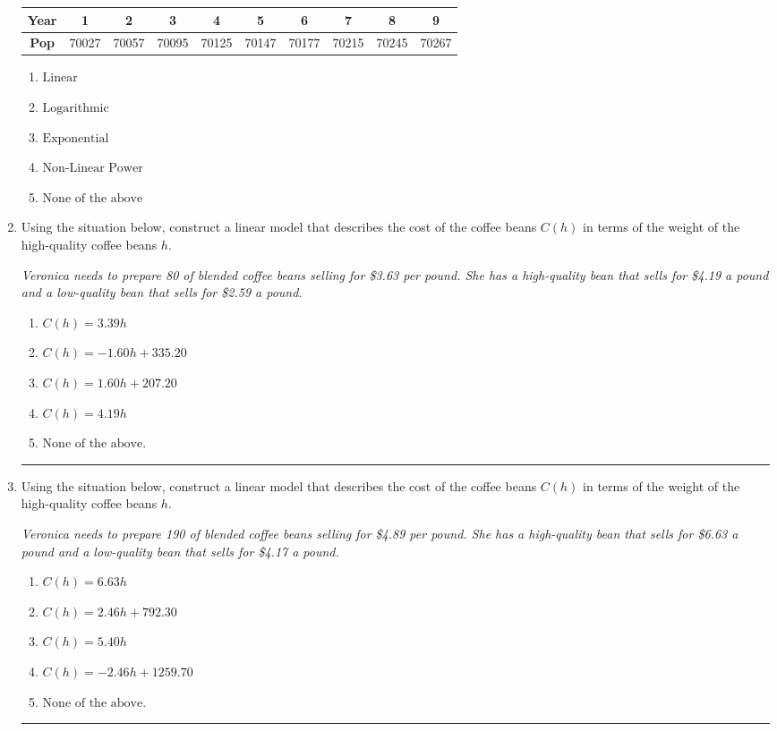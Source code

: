 \documentclass[14pt]{extbook}
\newcommand{\litem}[1]{\item#1\hspace*{-1cm}\rule{\textwidth}{0.4pt}}
\begin{document}
\begin{enumerate}
{\begin{tabular}{c|c|c|c|c|c|c|c|c|c}
\textbf{Year} &1 &2 &3 &4 &5 &6 &7 &8 &9\tabularnewline \hline
\textbf{Pop} &70027 &70057 &70095 &70125 &70147 &70177 &70215 &70245 &70267\end{tabular}\begin{enumerate}[label=\Alph*.]
\item \( \text{Linear} \)
\item \( \text{Logarithmic} \)
\item \( \text{Exponential} \)
\item \( \text{Non-Linear Power} \)
\item \( \text{None of the above} \)

\end{enumerate} }
\litem{
Using the situation below, construct a linear model that describes the cost of the coffee beans $C(h)$ in terms of the weight of the high-quality coffee beans $h$.
\begin{center}
    \textit{ Veronica needs to prepare 80 of blended coffee beans selling for \$3.63 per pound. She has a high-quality bean that sells for \$4.19 a pound and a low-quality bean that sells for \$2.59 a pound. }
\end{center}
\begin{enumerate}[label=\Alph*.]
\item \( C(h) = 3.39 h \)
\item \( C(h) = -1.60 h + 335.20 \)
\item \( C(h) = 1.60 h + 207.20 \)
\item \( C(h) = 4.19 h \)
\item \( \text{None of the above.} \)

\end{enumerate} }
\litem{
Using the situation below, construct a linear model that describes the cost of the coffee beans $C(h)$ in terms of the weight of the high-quality coffee beans $h$.
\begin{center}
    \textit{ Veronica needs to prepare 190 of blended coffee beans selling for \$4.89 per pound. She has a high-quality bean that sells for \$6.63 a pound and a low-quality bean that sells for \$4.17 a pound. }
\end{center}
\begin{enumerate}[label=\Alph*.]
\item \( C(h) = 6.63 h \)
\item \( C(h) = 2.46 h + 792.30 \)
\item \( C(h) = 5.40 h \)
\item \( C(h) = -2.46 h + 1259.70 \)
\item \( \text{None of the above.} \)


\end{enumerate}}
\end{enumerate}
\end{document}
